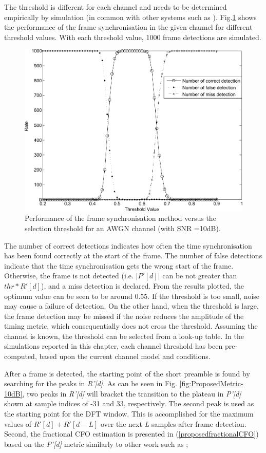 The threshold is different for each channel and needs to be determined empirically by simulation (in common with other systems such as \cite{Kishore2006}).
Fig.\ref{fig:TimeSyn_thr_AWGN} shows the performance of the frame synchronisation in the given channel for different threshold values.
With each threshold value, 1000 frame detections are simulated. 
\begin{figure}
	\centerline{\includegraphics [width=1\columnwidth] {figures/ThresholdEffect.pdf}}
	\caption{Performance of the frame synchronisation method versus the selection threshold for an AWGN channel (with SNR =10dB).}
	\label{fig:TimeSyn_thr_AWGN}
\end{figure}
The number of correct detections indicates how often the time synchronisation has been found correctly at the start of the frame.
The number of false detections indicate that the time synchronisation gets the wrong start of the frame.
Otherwise, the frame is not detected (i.e. $|P'[d]|$ can be not greater than $thr * R'[d]$), and a miss detection is declared. 
From the results plotted,  the optimum value can be seen to be around 0.55. 
If the threshold is too small, noise may cause a failure of detection.
On the other hand, when the threshold is large, the frame detection may be missed if the noise reduces the amplitude of the timing metric, which consequentially does not cross the threshold. 
Assuming the channel is known, the threshold can be selected from a look-up table. In the simulations reported in this chapter, each channel threshold has been pre-computed, based upon the current channel model and conditions.

After a frame is detected, the starting point of the short preamble is found by searching for the peaks in \emph{R'[d]}.
As can be seen in Fig. \ref{fig:ProposedMetric-10dB}, two peaks in \emph{R'[d]} will bracket the transition to the plateau in \emph{P'[d]} shown at sample indices of -31 and 33, respectively. 
The second peak is used as the starting point for the DFT window. 
This is accomplished for the maximum values of $R'[d] + R'[d - L]$ over the next \emph{L} samples after frame detection.
Second, the fractional CFO estimation is presented in (\ref{proposedfractionalCFO}) based on the \emph{P'[d]} metric similarly to other work such as \cite{Schmidl1997,Schwoerer2002,Manavi2004,Guffey2007,Huang2010,Recio2010};

